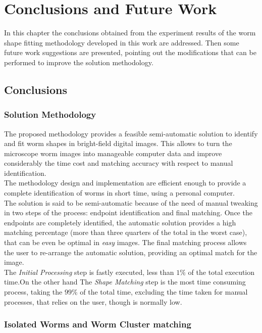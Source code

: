 \cleardoublepage
\chapter{Conclusions and Future Work}

In this chapter the conclusions obtained from the experiment results of the 
worm shape fitting methodology developed in this work are addressed.
Then some future work suggestions are presented, pointing out the modifications
that can be performed to improve the solution methodology.

\section{Conclusions}

\subsection*{Solution Methodology}

The proposed methodology provides a feasible semi-automatic solution
to identify and fit worm shapes in bright-field digital images. This allows
to turn the microscope worm images into manageable computer data and 
improve considerably the time cost and matching accuracy with respect
to manual identification.\\
The methodology design and implementation are efficient enough to provide
a complete identification of worms in short time, using a personal computer.\\
The solution is said to be semi-automatic because of the need of manual
tweaking in two steps of the process: endpoint identification and
final matching. Once the endpoints are completely identified, the automatic
solution provides a high matching percentage (more than three quarters of 
the total in the worst case), that can be even be optimal in \emph{easy} 
images. The final matching process allows the user to re-arrange the 
automatic solution, providing an optimal match for the image.\\
The \emph{Initial Processing} step is fastly executed, less than
$1\%$ of the total execution time.On the other hand The \emph{Shape Matching}
step is the most time consuming process, taking the $99\%$ of the total
time, excluding the time taken for manual processes, that relies on the user,
though is normally low.

\subsection*{Isolated Worms and Worm Cluster matching}

